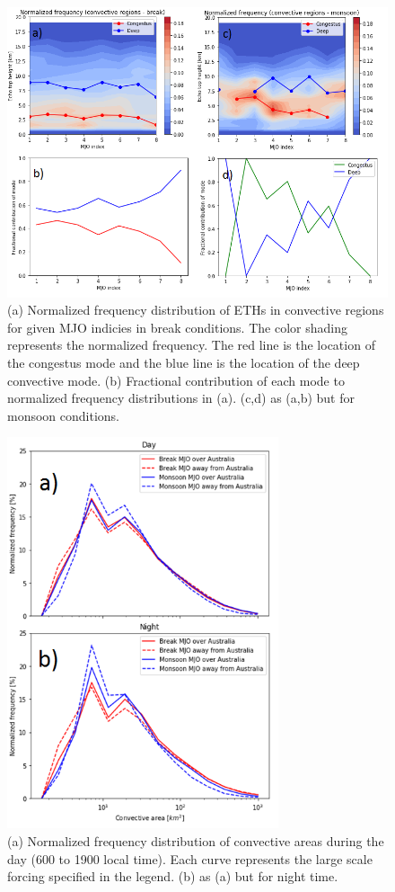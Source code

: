 \documentclass[journal abbreviation, manuscript]{copernicus}
\begin{document}
\begin{figure}[t]
\includegraphics[width=12cm]{distribution_of_modes_figure.png}
\caption{(a) Normalized frequency distribution of ETHs in convective regions for given MJO indicies in break conditions. The color shading represents the normalized frequency. The red line is the location of the congestus mode and the blue line is the location of the deep convective mode. (b)  Fractional contribution of each mode to normalized frequency distributions in (a). (c,d) as (a,b) but for monsoon conditions.}
\label{fig:pdfs_vs_mjo}
\end{figure}
\clearpage

\begin{figure}[t]
\includegraphics[width=8cm]{convective_areas.png}
\caption{(a) Normalized frequency distribution of convective areas during the day (600 to 1900 local time). Each curve represents the large scale forcing specified in the legend. (b) as (a) but for night time.}
\label{fig:conv_areas}
\end{figure}
\clearpage
\end{document}
